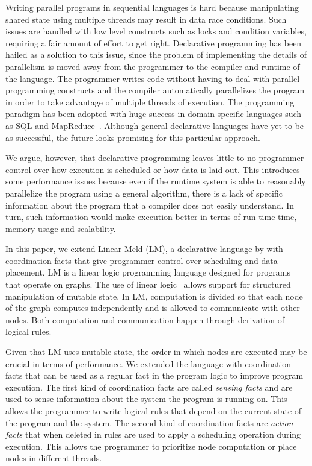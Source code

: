 
Writing parallel programs in sequential languages is hard because manipulating
shared state using multiple threads may result in data race
conditions. Such issues are handled with low level constructs such as locks and
condition variables, requiring a fair amount of effort to get right.
Declarative programming has been hailed as a solution to this issue, since the
problem of implementing the details of parallelism is moved away from the programmer to the
compiler and runtime of the language. The programmer writes code
without having to deal with parallel programming constructs and the compiler
automatically parallelizes the program in order to take advantage of
multiple threads of execution.
The programming paradigm has been adopted with huge success in domain specific
languages such as SQL and MapReduce~\cite{Dean:2008:MSD:1327452.1327492}.
Although general declarative languages have yet to be as successful, the
future looks promising for this particular approach.

We argue, however, that declarative programming leaves little to no programmer control
over how execution is scheduled or how data is laid out. This introduces some
performance issues because even if the runtime system is able to reasonably
parallelize the program using a general algorithm, there is a lack of specific
information about the program that a compiler does not easily understand. In
turn, such information would make execution better in terms of run time time,
memory usage and scalability.

In this paper, we extend Linear Meld (LM), a declarative language by
\cite{cruz-iclp14,cruz-ppdp14} with coordination facts that give programmer
control over scheduling and data placement. LM is a linear logic programming
language designed for programs that operate on graphs.  The use of linear
logic~\cite{girard-87} allows support for structured manipulation of mutable
state. In LM, computation is divided so that each node of the graph computes
independently and is allowed to communicate with other nodes.
Both computation and communication happen through derivation of logical rules.

Given that LM uses mutable state, the order in which nodes are executed may be
crucial in terms of performance. We extended the language with coordination
facts that can be used as a regular fact in the program logic to improve program
execution.  The first kind of coordination facts are called \emph{sensing facts}
and are used to sense information about the system the program is running on.
This allows the programmer to write logical rules that depend on the current
state of the program and the system. The second kind of coordination facts are
\emph{action facts} that when deleted in rules are used to apply a scheduling
operation during execution. This allows the programmer to prioritize node
computation or place nodes in different threads.

